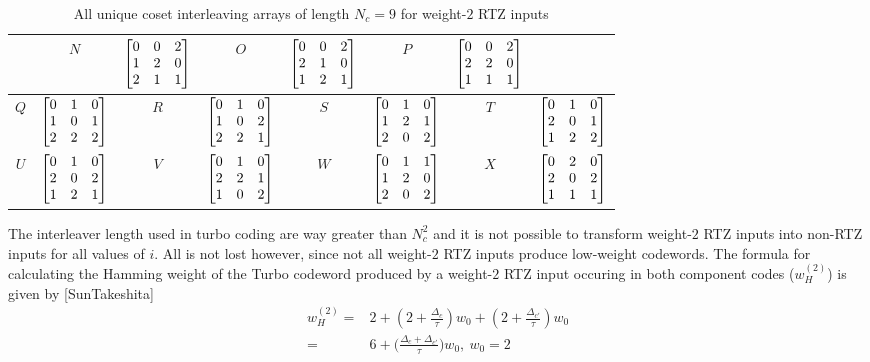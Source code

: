 \begin{table}[h!]
\begin{tabular}{|c || c | c|| c|c || c | c|| c|}
 &
  $N$ & $\begin{bmatrix}0 & 0 & 2 \cr 1 & 2 & 0 \cr 2 & 1 & 1 \end{bmatrix}$ 
 &
 $O$ & $\begin{bmatrix}0 & 0 & 2 \cr 2 & 1 & 0 \cr 1 & 2 & 1\end{bmatrix}$ 
&
 $P$ & $\begin{bmatrix}0 & 0 & 2 \cr 2 & 2 & 0 \cr 1 & 1 & 1\end{bmatrix}$\\ 
 \hline
 $Q$ & $\begin{bmatrix}0 & 1 & 0 \cr 1 & 0 & 1 \cr 2 & 2 & 2 \end{bmatrix}$
&
  $R$ & $\begin{bmatrix}0 & 1 & 0 \cr 1 & 0 & 2 \cr 2 & 2 & 1\end{bmatrix}$ 
&
 $S$ & $\begin{bmatrix}0 & 1 & 0 \cr 1 & 2 & 1 \cr 2 & 0 & 2 \end{bmatrix}$
 &
 $T$ & $\begin{bmatrix}0 & 1 & 0 \cr 2 & 0 & 1 \cr 1 & 2 & 2\end{bmatrix}$\\ 
 \hline
 $U$ & $\begin{bmatrix}0 & 1 & 0 \cr 2 & 0 & 2 \cr 1 & 2 & 1\end{bmatrix}$ 
 &
 $V$ & $\begin{bmatrix}0 & 1 & 0 \cr 2 & 2 & 1 \cr 1 & 0 & 2\end{bmatrix}$ 
 &
 $W$ & $\begin{bmatrix}0 & 1 & 1 \cr 1 & 2 & 0 \cr 2 & 0 & 2 \end{bmatrix}$
 &
 $X$ & $\begin{bmatrix}0 & 2 & 0 \cr 2 & 0 & 2 \cr 1 & 1 & 1\end{bmatrix}$\\ 
   \hline

  \end{tabular}
\caption{All unique coset interleaving arrays of length $N_c =9$ for weight-$2$ RTZ inputs}
\label{tb1}
\end{table}

The interleaver length used in turbo coding are way greater than $N_c^2$ and it is not possible to transform weight-$2$ RTZ inputs into non-RTZ inputs for all values of $i$. All is not lost however, since not all weight-$2$ RTZ inputs produce low-weight codewords. 
The formula for calculating the Hamming weight of the Turbo codeword produced by a weight-$2$ RTZ input occuring in both component codes  ($w^{(2)}_H$)  is given by [SunTakeshita] 
\begin{equation}
\begin{split}
w^{(2)}_H=&2+(2 + \frac{\Delta_c}{\tau} )w_0+ (2 + \frac{\Delta_{c'}}{\tau})w_0\\
=&6+\Big(\frac{\Delta_c+\Delta_{c'}}{\tau}\Big)w_0,~w_0=2
\end{split}
\label{eq3}
\end{equation}

